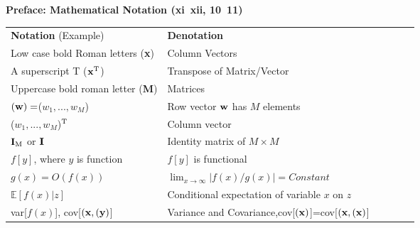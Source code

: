 \documentclass[a4paper,12pt]{article}
\begin{document}
\begin{center}
  \textbf{\Large Preface: Mathematical Notation (xi~xii, 10~11)}
\end{center}

\begin{tabular}{llllll}
\hline\noalign{\smallskip}
\textbf{Notation} (Example)  & \textbf{Denotation}\\
\noalign{\smallskip}
\hline
\noalign{\smallskip}
Low case bold Roman letters (\textbf{x})  & Column Vectors \\
\noalign{\smallskip}
\hline
\noalign{\smallskip}
A superscript T ($\rm \textbf{x}^{\rm T}$) & Transpose of Matrix/Vector \\
\noalign{\smallskip}
\hline
\noalign{\smallskip}
Uppercase bold roman letter (\textbf{M}) & Matrices \\
\noalign{\smallskip}
\hline
\noalign{\smallskip}
$(\rm \textbf{w})=$($w_1,...,w_M$) &  Row vector $\rm \textbf{w}$ has $M$ elements\\
\noalign{\smallskip}
\hline
\noalign{\smallskip}
($w_1,...,w_M$)$^{\rm T}$ & Column vector \\
\noalign{\smallskip}
\hline
\noalign{\smallskip}
$\textbf{\rm \textbf{I}}_{\rm M}$ or $\textbf{\rm \textbf{I}}$ & Identity matrix of $M \times M$ \\
\noalign{\smallskip}
\hline
\noalign{\smallskip}
$f[y]$, where $y$ is function & $f[y]$ is functional \\
\noalign{\smallskip}
\hline
\noalign{\smallskip}
$g(x) = O(f(x))$ & $\lim_{x \to \infty} |f(x)/g(x)| = Constant$ \\
\noalign{\smallskip}
\hline
\noalign{\smallskip}
$\mathds{E}[f(x)|z]$ & Conditional expectation of variable $x$ on $z$\\
\noalign{\smallskip}
\hline
\noalign{\smallskip}
var[$f(x)$], cov[$(\rm \textbf{x}, (\rm \textbf{y})$] & Variance and Covariance,cov[$(\rm \textbf{x})$]=cov[$(\rm \textbf{x}, (\rm \textbf{x})$]\\
\hline
\end{tabular} \\
\\
\end{document}
